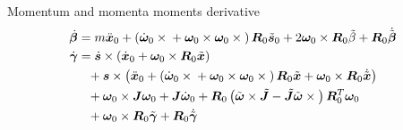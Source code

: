 \documentclass[10pt,dvips,fleqn,subeqn]{report}
\newcommand{\T}[1]{\bm{#1}}
\newcommand{\TT}[1]{\bm{#1}}
\begin{document}
Momentum and momenta moments derivative
\begin{subequations}
\begin{align}
	\dot{\T{\beta}}
	&= m \ddot{\T{x}}_0
	+ \plbr{
		\dot{\T{\omega}}_0 \times{}
		+ \T{\omega}_0 \times \T{\omega}_0 \times{}
	} \TT{R}_0 \tilde{\T{s}}_0
	+ 2 \T{\omega}_0 \times \TT{R}_0 \tilde{\beta}
	+ \TT{R}_0 \dot{\tilde{\T{\beta}}} \\
	\dot{\T{\gamma}}
	&= \dot{\T{s}} \times \plbr{
		\dot{\T{x}}_0
		+ \T{\omega}_0 \times \TT{R}_0 \tilde{\T{x}}
	}
	\nonumber \\
	&\hphantom{=}+ \T{s} \times \plbr{
		\ddot{\T{x}}_0
		+ \plbr{
			\dot{\T{\omega}}_0 \times{}
			+ \T{\omega}_0 \times \T{\omega}_0 \times{}
		} \TT{R}_0 \tilde{\T{x}}
		+ \T{\omega}_0 \times \TT{R}_0 \dot{\tilde{\T{x}}}
	}
	\nonumber \\
	&\hphantom{=}+ \T{\omega}_0 \times \TT{J} \T{\omega}_0
	+ \TT{J} \dot{\T{\omega}}_0
	+ \TT{R}_0 \plbr{
		\tilde{\T{\omega}} \times \tilde{\TT{J}}
		- \tilde{\TT{J}} \tilde{\T{\omega}} \times{}
	} \TT{R}_0^T \T{\omega}_0
	\nonumber \\
	&\hphantom{=}+ \T{\omega}_0 \times \TT{R}_0 \tilde{\T{\gamma}}
	+ \TT{R}_0 \dot{\tilde{\T{\gamma}}}
\end{align}
\end{subequations}
\end{document}
